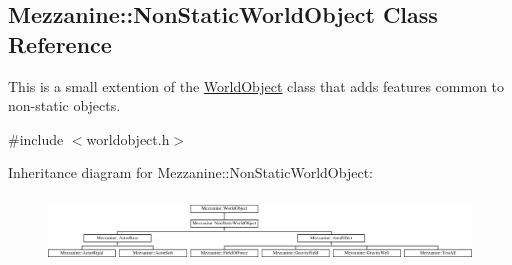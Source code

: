 \hypertarget{classMezzanine_1_1NonStaticWorldObject}{
\subsection{Mezzanine::NonStaticWorldObject Class Reference}
\label{classMezzanine_1_1NonStaticWorldObject}
}


This is a small extention of the \hyperlink{classMezzanine_1_1WorldObject}{WorldObject} class that adds features common to non-\/static objects.  




{\ttfamily \#include $<$worldobject.h$>$}

Inheritance diagram for Mezzanine::NonStaticWorldObject:\begin{figure}[H]
\begin{center}
\leavevmode
\includegraphics[height=1.769352cm]{classMezzanine_1_1NonStaticWorldObject}
\end{center}
\end{figure}
